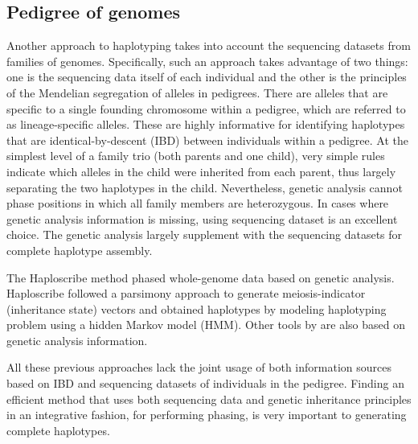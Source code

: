\subsection{Pedigree of genomes}
Another approach to haplotyping takes into account the sequencing datasets from families of genomes.
Specifically, such an approach takes advantage of two things: one is the sequencing data itself of each individual and the other is the principles of the Mendelian segregation of alleles in pedigrees. 
There are alleles that are specific to a single founding chromosome within a pedigree, which are referred to as lineage-specific alleles. 
These are highly informative for identifying haplotypes that are identical-by-descent (IBD) between individuals within a pedigree.
At the simplest level of a family trio (both parents and one child), very simple rules indicate which alleles in the child were inherited from each parent, thus largely separating the two haplotypes in the child.  
Nevertheless, genetic analysis cannot phase positions in which all family members are heterozygous. 
In cases where genetic analysis information is missing, using sequencing dataset is an excellent choice.
The genetic analysis largely supplement with the sequencing datasets for complete haplotype assembly.

The Haploscribe method \citep{Roach2011} phased whole-genome data based on genetic analysis. Haploscribe followed a parsimony approach to generate
meiosis-indicator (inheritance state) vectors and obtained haplotypes by modeling haplotyping problem using a hidden Markov model (HMM). 
Other tools by \cite{abecasis2002merlin, williams2010rapid} are also based on genetic analysis information. 

All these previous approaches lack the joint usage of both information sources based on IBD and sequencing datasets of individuals in the pedigree. 
Finding an efficient method that uses both sequencing data and genetic inheritance principles in an integrative fashion, for performing phasing, is very important to generating complete haplotypes.


